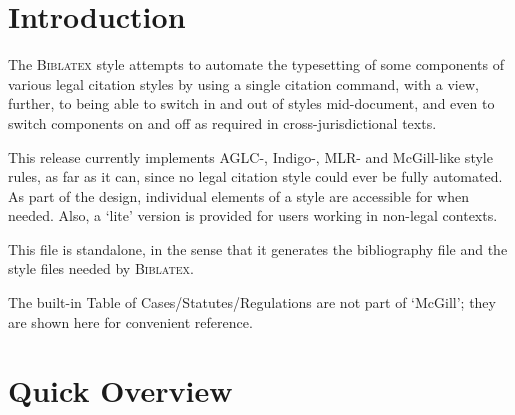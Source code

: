 
\begin{center}
\end{center}

\section{Introduction}
\p The  \textsc{Biblatex} style attempts to automate the typesetting of some components of various legal citation styles by using a single citation command, with a view, further, to being able to switch in and out of styles mid-document, and even to switch components on and off as required in cross-jurisdictional texts. 

\p This release currently implements AGLC-, Indigo-, MLR- and McGill-like style rules, as far as it can, since no legal citation style could ever be fully automated. As part of the design, individual elements of a style are accessible for when needed. Also, a `lite' version is provided for users working in non-legal contexts.

\p This file is standalone, in the sense that it generates the bibliography file and the style files needed by \textsc{Biblatex}.

\newpage
The built-in Table of Cases/Statutes/Regulations are not part of `McGill'; they are shown here for convenient reference.

\renewcommand\lcparnumrefsencap{}%
\printlawciteindexes



\newpage
\section{Quick Overview}
\bigskip
\ 

\medskip\noindent
{}

\newpage
\ 

